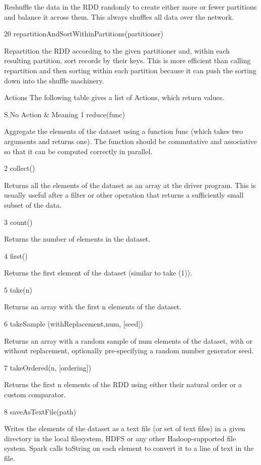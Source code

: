 Reshuffle the data in the RDD randomly to create either more or fewer partitions and balance it across them. This always shuffles all data over the network.

20	
repartitionAndSortWithinPartitions(partitioner)

Repartition the RDD according to the given partitioner and, within each resulting partition, sort records by their keys. This is more efficient than calling repartition and then sorting within each partition because it can push the sorting down into the shuffle machinery.

Actions
The following table gives a list of Actions, which return values.

S.No	Action & Meaning
1	
reduce(func)

Aggregate the elements of the dataset using a function func (which takes two arguments and returns one). The function should be commutative and associative so that it can be computed correctly in parallel.

2	
collect()

Returns all the elements of the dataset as an array at the driver program. This is usually useful after a filter or other operation that returns a sufficiently small subset of the data.

3	
count()

Returns the number of elements in the dataset.

4	
first()

Returns the first element of the dataset (similar to take (1)).

5	
take(n)

Returns an array with the first n elements of the dataset.

6	
takeSample (withReplacement,num, [seed])

Returns an array with a random sample of num elements of the dataset, with or without replacement, optionally pre-specifying a random number generator seed.

7	
takeOrdered(n, [ordering])

Returns the first n elements of the RDD using either their natural order or a custom comparator.

8	
saveAsTextFile(path)

Writes the elements of the dataset as a text file (or set of text files) in a given directory in the local filesystem, HDFS or any other Hadoop-supported file system. Spark calls toString on each element to convert it to a line of text in the file.

